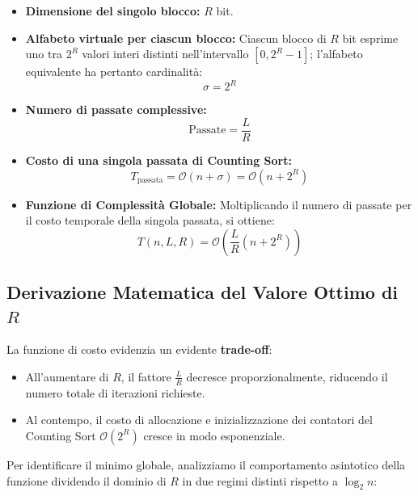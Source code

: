 \begin{itemize}
  \item \textbf{Dimensione del singolo blocco:} $R$ bit.
  \item \textbf{Alfabeto virtuale per ciascun blocco:} Ciascun blocco di $R$ bit esprime uno tra $2^R$ valori interi distinti nell'intervallo $[0, 2^R - 1]$; l'alfabeto equivalente ha pertanto cardinalit\`a:
  \begin{equation}
    \sigma = 2^R
  \end{equation}
  \item \textbf{Numero di passate complessive:}
  \begin{equation}
    \text{Passate} = \frac{L}{R}
  \end{equation}
  \item \textbf{Costo di una singola passata di Counting Sort:}
  \begin{equation}
    T_{\text{passata}} = \mathcal{O}(n + \sigma) = \mathcal{O}(n + 2^R)
  \end{equation}
  \item \textbf{Funzione di Complessit\`a Globale:}
  Moltiplicando il numero di passate per il costo temporale della singola passata, si ottiene:
  \begin{equation}
    T(n, L, R) = \mathcal{O}\left( \frac{L}{R} (n + 2^R) \right)
  \end{equation}
\end{itemize}

\FloatBarrier
\subsection{Derivazione Matematica del Valore Ottimo di $R$}
\label{subsec:derivazione-ottimo-r}

La funzione di costo evidenzia un evidente \textbf{trade-off}:
\begin{itemize}
  \item All'aumentare di $R$, il fattore $\frac{L}{R}$ decresce proporzionalmente, riducendo il numero totale di iterazioni richieste.
  \item Al contempo, il costo di allocazione e inizializzazione dei contatori del Counting Sort $\mathcal{O}(2^R)$ cresce in modo esponenziale.
\end{itemize}

Per identificare il minimo globale, analizziamo il comportamento asintotico della funzione dividendo il dominio di $R$ in due regimi distinti rispetto a $\log_2 n$:

